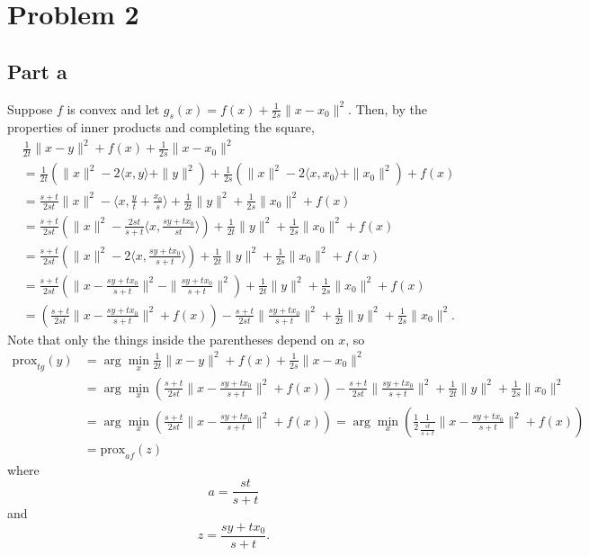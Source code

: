 \documentclass{article}
\newcommand{\prox}{\mathrm{prox}}
\begin{document}
\section{Problem 2}
\subsection{Part a}
Suppose $f$ is convex and let $g_s(x) = f(x) + \frac{1}{2s}\|x-x_0\|^2$. Then, by the properties of inner products and completing the square,
\begin{align*}
&\frac{1}{2t}\|x-y\|^2 + f(x)+\frac{1}{2s}\|x-x_0\|^2\\&=
\frac{1}{2t}(\|x\|^2-2\langle x,y\rangle+\|y\|^2)+\frac{1}{2s}(\|x\|^2-2\langle x,x_0\rangle+\|x_0\|^2)+f(x)\\&=
\frac{s+t}{2st}\|x\|^2-\langle x,\frac{y}{t}+\frac{x_0}{s}\rangle + \frac{1}{2t}\|y\|^2+\frac{1}{2s}\|x_0\|^2+f(x)\\&=
\frac{s+t}{2st}\left(\|x\|^2-\frac{2st}{s+t}\langle x,\frac{sy+tx_0}{st}\rangle\right)+\frac{1}{2t}\|y\|^2+\frac{1}{2s}\|x_0\|^2+f(x)\\&=
\frac{s+t}{2st}\left(\|x\|^2-2\langle x,\frac{sy+tx_0}{s+t}\rangle\right)+\frac{1}{2t}\|y\|^2+\frac{1}{2s}\|x_0\|^2+f(x)\\&=
\frac{s+t}{2st}\left(\|x-\frac{sy+tx_0}{s+t}\|^2-\|\frac{sy+tx_0}{s+t}\|^2\right)+\frac{1}{2t}\|y\|^2+\frac{1}{2s}\|x_0\|^2+f(x)\\&=
\left(\frac{s+t}{2st}\|x-\frac{sy+tx_0}{s+t}\|^2+f(x)\right)-\frac{s+t}{2st}\|\frac{sy+tx_0}{s+t}\|^2+\frac{1}{2t}\|y\|^2+\frac{1}{2s}\|x_0\|^2.
\end{align*}
Note that only the things inside the parentheses depend on $x$, so
\begin{align*}
\prox_{t g}(y)&=\arg\min_{x}\frac{1}{2t}\|x-y\|^2 + f(x)+\frac{1}{2s}\|x-x_0\|^2\\&=
\arg\min_{x}\left(\frac{s+t}{2st}\|x-\frac{sy+tx_0}{s+t}\|^2+f(x)\right)-\frac{s+t}{2st}\|\frac{sy+tx_0}{s+t}\|^2+\frac{1}{2t}\|y\|^2+\frac{1}{2s}\|x_0\|^2\\&=
\arg\min_{x}\left(\frac{s+t}{2st}\|x-\frac{sy+tx_0}{s+t}\|^2+f(x)\right)=\arg\min_{x}\left(\frac{1}{2}\frac{1}{\frac{st}{s+t}}\|x-\frac{sy+tx_0}{s+t}\|^2+f(x)\right)\\&=\prox_{a f}(z)
\end{align*}
where
\[
a=\frac{st}{s+t}
\]
and 
\[
z=\frac{sy+tx_0}{s+t}.
\]
\end{document}
